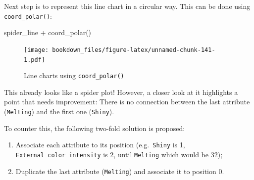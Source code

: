 \documentclass[
]{krantz}
\makeatletter
\newenvironment{Shaded}{\begin{snugshade}}{\end{snugshade}}
\newcommand{\AttributeTok}[1]{\textcolor[rgb]{0.61,0.61,0.61}{#1}}
\newcommand{\DecValTok}[1]{\textcolor[rgb]{0.06,0.06,0.06}{#1}}
\newcommand{\FunctionTok}[1]{\textcolor[rgb]{0,0,0}{#1}}
\newcommand{\NormalTok}[1]{#1}
\newcommand{\OtherTok}[1]{\textcolor[rgb]{0.37,0.37,0.37}{#1}}
\newcommand{\SpecialCharTok}[1]{\textcolor[rgb]{0,0,0}{#1}}
\newcommand{\StringTok}[1]{\textcolor[rgb]{0.5,0.5,0.5}{#1}}
\providecommand{\tightlist}{%
  \setlength{\itemsep}{0pt}\setlength{\parskip}{0pt}}
\newenvironment{kframe}{%
\medskip{}
\setlength{\fboxsep}{.8em}
 \def\at@end@of@kframe{}%
 \ifinner\ifhmode%
  \def\at@end@of@kframe{\end{minipage}}%
  \begin{minipage}{\columnwidth}%
 \fi\fi%
 \def\FrameCommand##1{\hskip\@totalleftmargin \hskip-\fboxsep
 \colorbox{shadecolor}{##1}\hskip-\fboxsep
     \hskip-\linewidth \hskip-\@totalleftmargin \hskip\columnwidth}%
 \MakeFramed {\advance\hsize-\width
   \@totalleftmargin\z@ \linewidth\hsize
   \@setminipage}}%
 {\par\unskip\endMakeFramed%
 \at@end@of@kframe}
\renewenvironment{Shaded}{\begin{kframe}}{\end{kframe}}
\makeatother
\begin{document}
Next step is to represent this line chart in a circular way. This can be done using \texttt{coord\_polar()}:

\begin{Shaded}
\begin{Highlighting}[]
\NormalTok{spider\_line }\SpecialCharTok{+} \FunctionTok{coord\_polar}\NormalTok{()}
\end{Highlighting}
\end{Shaded}

\begin{figure}
\centering
\texttt{[image: bookdown\_files/figure-latex/unnamed-chunk-141-1.pdf]}
\caption{\label{fig:unnamed-chunk-141}Line charts using \texttt{coord\_polar()}}
\end{figure}

This already looks like a spider plot! However, a closer look at it highlights a point that needs improvement: There is no connection between the last attribute (\texttt{Melting}) and the first one (\texttt{Shiny}).

To counter this, the following two-fold solution is proposed:

\begin{enumerate}
\def\labelenumi{\arabic{enumi}.}
\tightlist
\item
  Associate each attribute to its position (e.g.~\texttt{Shiny} is 1, \texttt{External\ color\ intensity} is 2, until \texttt{Melting} which would be 32);
\item
  Duplicate the last attribute (\texttt{Melting}) and associate it to position 0.
\end{enumerate}

\begin{Shaded}
\end{Shaded}
\end{document}
